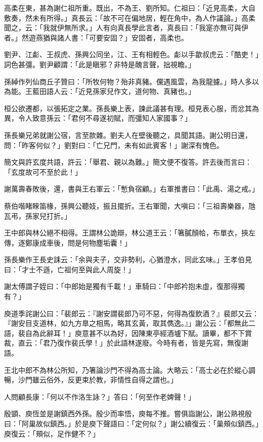 高柔在東，甚為謝仁祖所重。既出，不為王、劉所知。仁祖曰：「近見高柔，大自敷奏，然未有所得。」真長云：「故不可在偏地居，輕在角中，為人作議論。」高柔聞之，云：「我就伊無所求。」人有向真長學此言者，真長曰：「我寔亦無可與伊者。」然遊燕猶與諸人書：「可要安固？」安固者，高柔也。

劉尹、江虨、王叔虎、孫興公同坐，江、王有相輕色。虨以手歙叔虎云：「酷吏！」詞色甚彊。劉尹顧謂：「此是瞋邪？非特是醜言聲，拙視瞻。」

孫綽作列仙商丘子贊曰：「所牧何物？殆非真豬。儻遇風雲，為我龍攄。」時人多以為能。王藍田語人云：「近見孫家兒作文，道何物、真豬也。」

桓公欲遷都，以張拓定之業。孫長樂上表，諫此議甚有理。桓見表心服，而忿其為異，令人致意孫云：「君何不尋遂初賦，而彊知人家國事？」

孫長樂兄弟就謝公宿，言至款雜。劉夫人在壁後聽之，具聞其語。謝公明日還，問：「昨客何似？」劉對曰：「亡兄門，未有如此賓客！」謝深有愧色。

簡文與許玄度共語，許云：「舉君、親以為難。」簡文便不復答。許去後而言曰：「玄度故可不至於此！」

謝萬壽春敗後，還，書與王右軍云：「慙負宿顧。」右軍推書曰：「此禹、湯之戒。」

蔡伯喈睹睞笛椽，孫興公聽妓，振且擺折。王右軍聞，大嗔曰：「三祖壽樂器，虺瓦弔，孫家兒打折。」

王中郎與林公絕不相得。王謂林公詭辯，林公道王云：「箸膩顏帢，布單衣，挾左傳，逐鄭康成車後，問是何物塵垢囊！」

孫長樂作王長史誄云：「余與夫子，交非勢利，心猶澄水，同此玄味。」王孝伯見曰：「才士不遜，亡祖何至與此人周旋！」

謝太傅謂子姪曰：「中郎始是獨有千載！」車騎曰：「中郎衿抱未虛，復那得獨有？」

庾道季詫謝公曰：「裴郎云：『謝安謂裴郎乃可不惡，何得為復飲酒？』裴郎又云：『謝安目支道林，如九方臯之相馬，略其玄黃，取其儁逸。』」謝公云：「都無此二語，裴自為此辭耳！」庾意甚不以為好，因陳東亭經酒壚下賦。讀畢，都不下賞裁，直云：「君乃復作裴氏學！」於此語林遂廢。今時有者，皆是先寫，無復謝語。

王北中郎不為林公所知，乃箸論沙門不得為高士論。大略云：「高士必在於縱心調暢，沙門雖云俗外，反更束於教，非情性自得之謂也。」

人問顧長康：「何以不作洛生詠？」答曰：「何至作老婢聲！」

殷顗、庾恆並是謝鎮西外孫。殷少而率悟，庾每不推。嘗俱詣謝公，謝公熟視殷曰：「阿巢故似鎮西。」於是庾下聲語曰：「定何似？」謝公續復云：「巢頰似鎮西。」庾復云：「頰似，足作健不？」


